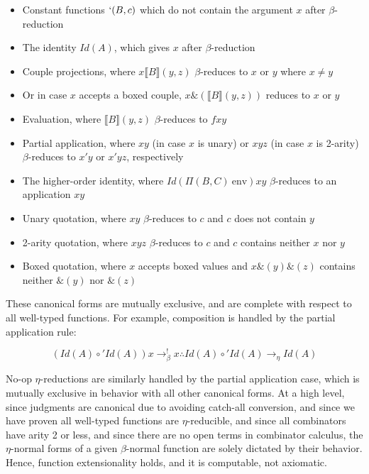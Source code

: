 \documentclass{article}
\newcommand{\llb}{\llbracket}
\newcommand{\rrb}{\rrbracket}
\newcommand{\arr}{\rightarrow}
\newcommand{\barr}{\arr_{\beta}}
\newcommand{\earr}{\arr_{\eta}}
\begin{document}
\begin{itemize}
  \item Constant functions \(`(B, c)\) which do not contain the argument \(x\) after \(\beta\)-reduction
  \item The identity \(Id(A)\), which gives \(x\) after \(\beta\)-reduction
  \item Couple projections, where \(x \llb B \rrb (y, z)\) \(\beta\)-reduces to \(x\) or \(y\) where \(x \neq y\)
    \item Or in case \(x\) accepts a boxed couple, \(x \&(\llb B \rrb (y, z))\) reduces to \(x\) or \(y\)
  \item Evaluation, where \(\llb B \rrb (y, z)\) \(\beta\)-reduces to \(f x y\)
  \item Partial application, where \(x y\) (in case \(x\) is unary) or \(x y z\) (in case \(x\) is 2-arity) \(\beta\)-reduces to \(x' y\) or \(x' y z\), respectively
  \item The higher-order identity, where \(Id(\Pi(B, C)\ \text{env}) x y\) \(\beta\)-reduces to an application \(x y\)
  \item Unary quotation, where \(x y\) \(\beta\)-reduces to \(c\) and \(c\) does not contain \(y\)
  \item 2-arity quotation, where \(x y z\) \(\beta\)-reduces to \(c\) and \(c\) contains neither \(x\) nor \(y\)
  \item Boxed quotation, where \(x\) accepts boxed values and \(x \&(y) \&(z)\) contains neither \(\&(y)\) nor \(\&(z)\)
\end{itemize}

These canonical forms are mutually exclusive, and are complete with respect to all well-typed functions. For example, composition is handled by the partial application rule:

\begin{equation}
  (Id(A) \circ' Id(A)) x \barr^{!} x \therefore Id(A) \circ' Id(A) \earr Id(A)
\end{equation}

No-op \(\eta\)-reductions are similarly handled by the partial application case, which is mutually exclusive in behavior with all other canonical forms. At a high level, since judgments are canonical due to avoiding catch-all conversion, and since we have proven all well-typed functions are \(\eta\)-reducible, and since all combinators have arity 2 or less, and since there are no open terms in combinator calculus, the \(\eta\)-normal forms of a given \(\beta\)-normal function are solely dictated by their behavior. Hence, function extensionality holds, and it is computable, not axiomatic.
\end{document}

